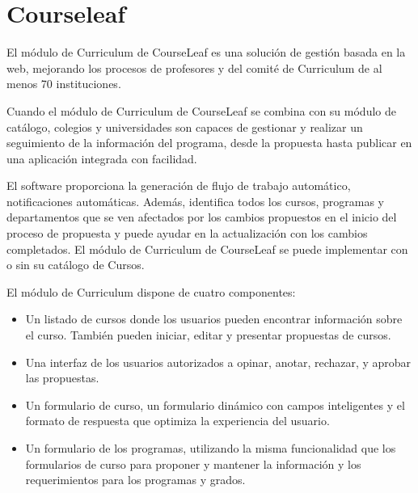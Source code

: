 \section{Courseleaf}
El módulo de Curriculum de CourseLeaf es una solución de gestión basada en la web, mejorando los procesos de profesores y del comité de Curriculum de al menos 70 instituciones\citep{courseleaf_webpage}.

Cuando el módulo de Curriculum de CourseLeaf se combina con su módulo de catálogo, colegios y universidades son capaces de gestionar y realizar un seguimiento de la información del programa, desde la propuesta hasta publicar en una aplicación integrada con facilidad.

El software proporciona la generación de flujo de trabajo automático, notificaciones automáticas. Además, identifica todos los cursos, programas y departamentos que se ven afectados por los cambios propuestos en el inicio del proceso de propuesta y puede ayudar en la actualización con los cambios completados. El módulo de Curriculum de CourseLeaf se puede implementar con o sin su catálogo de Cursos.

El módulo de Curriculum dispone de cuatro componentes:
\begin{itemize}
	\item Un listado de cursos donde los usuarios pueden encontrar información sobre el curso. También pueden iniciar, editar y presentar propuestas de cursos.
	\item Una interfaz de los usuarios autorizados a opinar, anotar, rechazar, y aprobar las propuestas.
	\item Un formulario de curso, un formulario dinámico con campos inteligentes y el formato de respuesta que optimiza la experiencia del usuario.
	\item Un formulario de los programas, utilizando la misma funcionalidad que los formularios de curso para proponer y mantener la información y los requerimientos para los programas y grados.
\end{itemize}